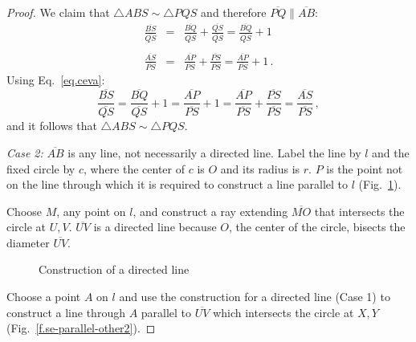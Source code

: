 \begin{proof}
We claim that $\triangle ABS \sim \triangle PQS$ and therefore $\overline{PQ}\|\overline{AB}$:
\begin{eqnarray*}
\frac{\overline{BS}}{\overline{QS}}&=&\frac{\overline{BQ}}{\overline{QS}}+\frac{\overline{QS}}{\overline{QS}} = \frac{\overline{BQ}}{\overline{QS}}+1\\
&&\\
\frac{\overline{AS}}{\overline{PS}} &=& \frac{\overline{AP}}{\overline{PS}} + \frac{\overline{PS}}{\overline{PS}} = \frac{\overline{AP}}{\overline{PS}} + 1\,.
\end{eqnarray*}
Using Eq.~\ref{eq.ceva}:
\[
\frac{\overline{BS}}{\overline{QS}}=\frac{\overline{BQ}}{\overline{QS}}+1=\frac{\overline{AP}}{\overline{PS}}+1=\frac{\overline{AP}}{\overline{PS}}+\frac{\overline{PS}}{\overline{PS}}=\frac{\overline{AS}}{\overline{PS}}\,,
\]
and it follows that $\triangle ABS \sim \triangle PQS$.


\textit{Case 2:}
$\overline{AB}$ is any line, not necessarily a directed line. Label the line by $l$ and the fixed circle by $c$, where the center of $c$ is $O$ and its radius is $r$. $P$ is the point not on the line through which it is required to construct a line parallel to $l$ (Fig.~\ref{f.se-parallel-other1}).

Choose $M$, any point on $l$, and construct a ray extending $\overline{MO}$ that intersects the circle at $U,V$.
$\overline{UV}$ is a directed line because $O$, the center of the circle, bisects the diameter $\overline{UV}$. 
\begin{figure}[ht]
\begin{center}
\end{center}
\caption{Construction of  a directed line}\label{f.se-parallel-other1}
\end{figure}

Choose a point $A$ on $l$ and use the construction for a directed line (Case 1) to construct a line through $A$ parallel to $\overline{UV}$ which intersects the circle at $X,Y$ (Fig.~\ref{f.se-parallel-other2}).


\end{proof}
